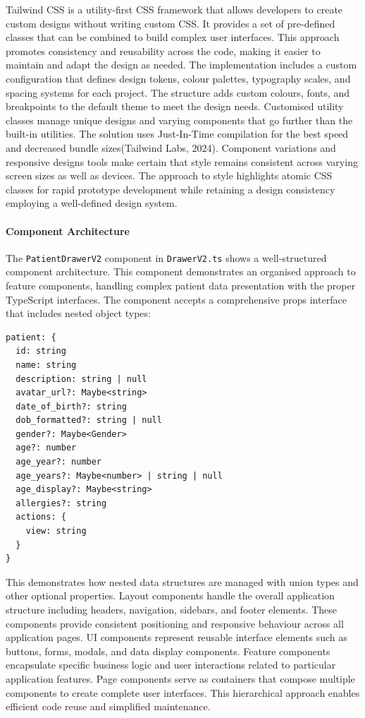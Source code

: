 Tailwind CSS is a utility-first CSS framework that allows developers to create custom designs without writing custom CSS. It provides a set of pre-defined classes that can be combined to build complex user interfaces. This approach promotes consistency and reusability across the code, making it easier to maintain and adapt the design as needed.
The implementation includes a custom configuration that defines design tokens, colour palettes, typography scales, and spacing systems for each project. The structure adds custom colours, fonts, and breakpoints to the default theme to meet the design needs. Customised utility classes manage unique designs and varying components  that go further than the built-in utilities. The solution uses Just-In-Time compilation for the best speed and decreased bundle sizes(Tailwind Labs, 2024). Component variations and responsive designs tools make certain that style remains consistent across varying screen sizes as well as devices. The approach to style highlights atomic CSS classes for rapid prototype development while retaining a design consistency employing a well-defined design system.

\paragraph{Component Architecture}\mbox{}

The \texttt{PatientDrawerV2} component in \texttt{DrawerV2.ts} shows a well-structured component architecture. This component demonstrates an organised approach to feature components, handling complex patient data presentation with the proper TypeScript interfaces.
The component accepts a comprehensive props interface that includes nested object types:

\begin{verbatim}
patient: {
  id: string
  name: string
  description: string | null
  avatar_url?: Maybe<string>
  date_of_birth?: string
  dob_formatted?: string | null
  gender?: Maybe<Gender>
  age?: number
  age_year?: number
  age_years?: Maybe<number> | string | null
  age_display?: Maybe<string>
  allergies?: string
  actions: {
    view: string
  }
}
\end{verbatim}

This demonstrates how nested data structures are managed with union types and other optional properties.
Layout components handle the overall application structure including headers, navigation, sidebars, and footer elements. These components provide consistent positioning and responsive behaviour across all application pages. UI components represent reusable interface elements such as buttons, forms, modals, and data display components. Feature components encapsulate specific business logic and user interactions related to particular application features. Page components serve as containers that compose multiple components to create complete user interfaces. This hierarchical approach enables efficient code reuse and simplified maintenance.

